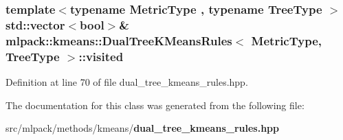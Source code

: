 \subsubsection[{visited}]{\setlength{\rightskip}{0pt plus 5cm}template$<$typename Metric\+Type , typename Tree\+Type $>$ std\+::vector$<$bool$>$\& {\bf mlpack\+::kmeans\+::\+Dual\+Tree\+K\+Means\+Rules}$<$ Metric\+Type, Tree\+Type $>$\+::visited\hspace{0.3cm}{\ttfamily [private]}}\label{classmlpack_1_1kmeans_1_1DualTreeKMeansRules_a3602e522aa673f07c76f00e4b5a9da03}


Definition at line 70 of file dual\+\_\+tree\+\_\+kmeans\+\_\+rules.\+hpp.



The documentation for this class was generated from the following file\+:\begin{DoxyCompactItemize}
\item 
src/mlpack/methods/kmeans/{\bf dual\+\_\+tree\+\_\+kmeans\+\_\+rules.\+hpp}\end{DoxyCompactItemize}
